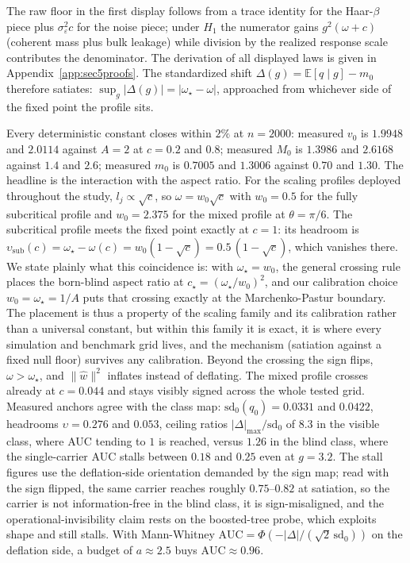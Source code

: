 The raw floor in the first display follows from a trace identity for the Haar-$\beta$ piece plus $\sigma_\varepsilon^2 c$ for the noise piece; under $H_1$ the numerator gains $g^2(\omega+c)$ (coherent mass plus bulk leakage) while division by the realized response scale contributes the denominator. The derivation of all displayed laws is given in Appendix~\ref{app:sec5proofs}. The standardized shift $\Delta(g)=\mathbb{E}[q\mid g]-m_0$ therefore satiates: $\sup_g|\Delta(g)|=|\omega_\star-\omega|$, approached from whichever side of the fixed point the profile sits.

Every deterministic constant closes within $2\%$ at $n=2000$: measured $v_0$ is $1.9948$ and $2.0114$ against $A=2$ at $c=0.2$ and $0.8$; measured $M_0$ is $1.3986$ and $2.6168$ against $1.4$ and $2.6$; measured $m_0$ is $0.7005$ and $1.3006$ against $0.70$ and $1.30$. The headline is the interaction with the aspect ratio. For the scaling profiles deployed throughout the study, $l_j\propto\sqrt c$, so $\omega=w_0\sqrt c$ with $w_0=0.5$ for the fully subcritical profile and $w_0=2.375$ for the mixed profile at $\theta=\pi/6$. The subcritical profile meets the fixed point exactly at $c=1$: its headroom is $\upsilon_{\mathrm{sub}}(c)=\omega_\star-\omega(c)=w_0(1-\sqrt c)=0.5\,(1-\sqrt c)$, which vanishes there. We state plainly what this coincidence is: with $\omega_\star=w_0$, the general crossing rule places the born-blind aspect ratio at $c_\star=(\omega_\star/w_0)^2$, and our calibration choice $w_0=\omega_\star=1/A$ puts that crossing exactly at the Marchenko-Pastur boundary. The placement is thus a property of the scaling family and its calibration rather than a universal constant, but within this family it is exact, it is where every simulation and benchmark grid lives, and the mechanism (satiation against a fixed null floor) survives any calibration. Beyond the crossing the sign flips, $\omega>\omega_\star$, and $\|\hat w\|^2$ inflates instead of deflating. The mixed profile crosses already at $c=0.044$ and stays visibly signed across the whole tested grid. Measured anchors agree with the class map: $\mathrm{sd}_0(q_0)=0.0331$ and $0.0422$, headrooms $\upsilon=0.276$ and $0.053$, ceiling ratios $|\Delta|_{\max}/\mathrm{sd}_0$ of $8.3$ in the visible class, where AUC tending to $1$ is reached, versus $1.26$ in the blind class, where the single-carrier AUC stalls between $0.18$ and $0.25$ even at $g=3.2$. The stall figures use the deflation-side orientation demanded by the sign map; read with the sign flipped, the same carrier reaches roughly $0.75$--$0.82$ at satiation, so the carrier is not information-free in the blind class, it is sign-misaligned, and the operational-invisibility claim rests on the boosted-tree probe, which exploits shape and still stalls. With Mann-Whitney $\mathrm{AUC}=\Phi(-|\Delta|/(\sqrt 2\,\mathrm{sd}_0))$ on the deflation side, a budget of $a\approx 2.5$ buys $\mathrm{AUC}\approx 0.96$.

